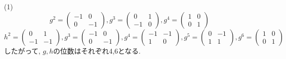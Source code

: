 (1) 
\[
g^2=\begin{pmatrix}-1&0\\0&-1\end{pmatrix},
g^3=\begin{pmatrix}0&1\\-1&0\end{pmatrix},
g^4=\begin{pmatrix}1&0\\0&1\end{pmatrix}
\]
\[h^2=\begin{pmatrix}0&1\\-1&-1\end{pmatrix},
g^3=\begin{pmatrix}-1&0\\0&-1\end{pmatrix},
g^4=\begin{pmatrix}-1&-1\\1&0\end{pmatrix},
g^5=\begin{pmatrix}0&-1\\1&1\end{pmatrix},
g^6=\begin{pmatrix}1&0\\0&1\end{pmatrix}
\]
したがって, $g,h$の位数はそれぞれ4,6となる.

